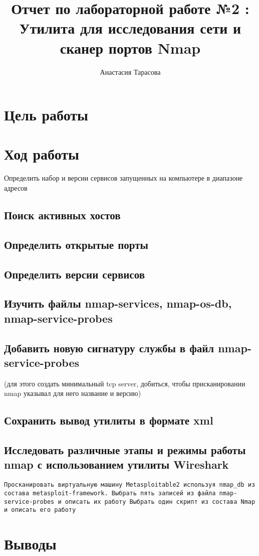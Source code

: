 \documentclass[12pt,a4paper]{article}
\author{Анастасия Тарасова}
\title{Отчет по лабораторной работе №2 :\\ Утилита для исследования сети и сканер
портов Nmap}
\begin{document}
\maketitle
\section{Цель работы}

\section{Ход работы}
Определить набор и версии сервисов запущенных на компьютере в диапазоне адресов
\subsection{Поиск активных хостов}

\subsection{Определить открытые порты}

\subsection{Определить версии сервисов}

\subsection{Изучить файлы nmap-services, nmap-os-db, nmap-service-probes}

\subsection{Добавить новую сигнатуру службы в файл nmap-service-probes}
(для этого создать минимальный tcp server, добиться, чтобы присканировании nmap указывал для него название и версию)
\subsection{Сохранить вывод утилиты в формате xml}
\subsection{Исследовать различные этапы и режимы работы nmap с использованием утилиты Wireshark}
\verb+Просканировать виртуальную машину Metasploitable2 используя nmap_db из состава metasploit-framework. Выбрать пять записей из файла nmap-service-probes и описать их работу Выбрать один скрипт из состава Nmap и описать его работу+
\section{Выводы}
\end{document}
